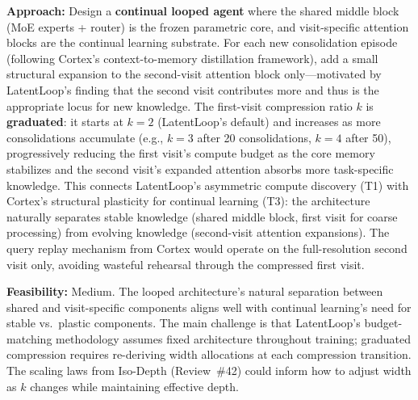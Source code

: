 \documentclass[11pt,a4paper]{article}
\begin{document}
\textbf{Approach:} Design a \textbf{continual looped agent} where the shared middle block (MoE experts + router) is the frozen parametric core, and visit-specific attention blocks are the continual learning substrate. For each new consolidation episode (following Cortex's context-to-memory distillation framework), add a small structural expansion to the second-visit attention block only---motivated by LatentLoop's finding that the second visit contributes more and thus is the appropriate locus for new knowledge. The first-visit compression ratio $k$ is \textbf{graduated}: it starts at $k{=}2$ (LatentLoop's default) and increases as more consolidations accumulate (e.g., $k{=}3$ after 20 consolidations, $k{=}4$ after 50), progressively reducing the first visit's compute budget as the core memory stabilizes and the second visit's expanded attention absorbs more task-specific knowledge. This connects LatentLoop's asymmetric compute discovery (T1) with Cortex's structural plasticity for continual learning (T3): the architecture naturally separates stable knowledge (shared middle block, first visit for coarse processing) from evolving knowledge (second-visit attention expansions). The query replay mechanism from Cortex would operate on the full-resolution second visit only, avoiding wasteful rehearsal through the compressed first visit.

\textbf{Feasibility:} Medium. The looped architecture's natural separation between shared and visit-specific components aligns well with continual learning's need for stable vs.\ plastic components. The main challenge is that LatentLoop's budget-matching methodology assumes fixed architecture throughout training; graduated compression requires re-deriving width allocations at each compression transition. The scaling laws from Iso-Depth (Review~\#42) could inform how to adjust width as $k$ changes while maintaining effective depth.
\end{document}
